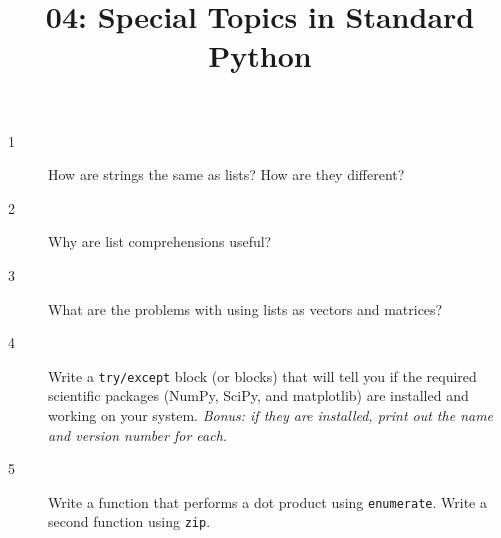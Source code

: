 \documentclass[10pt]{amsart}
\title{04: Special Topics in Standard Python}
\begin{document}
\maketitle

\begin{description}
\item[1] How are strings the same as lists? How are they different?
\vspace{0.75in}

\item[2] Why are list comprehensions useful?
\vspace{0.75in}

\item[3] What are the problems with using lists as vectors and matrices?
\vspace{0.75in}

\item[4] Write a \verb+try/except+ block (or blocks) that will tell you if the
required scientific packages (NumPy, SciPy, and matplotlib) are installed and
working on your system. \textit{Bonus: if they are installed, print out the name
and version number for each.}
\vspace{0.75in}

\item[5] Write a function that performs a dot product using \verb+enumerate+.
Write a second function using \verb+zip+.
\vspace{0.75in}
\end{description}
\end{document}

